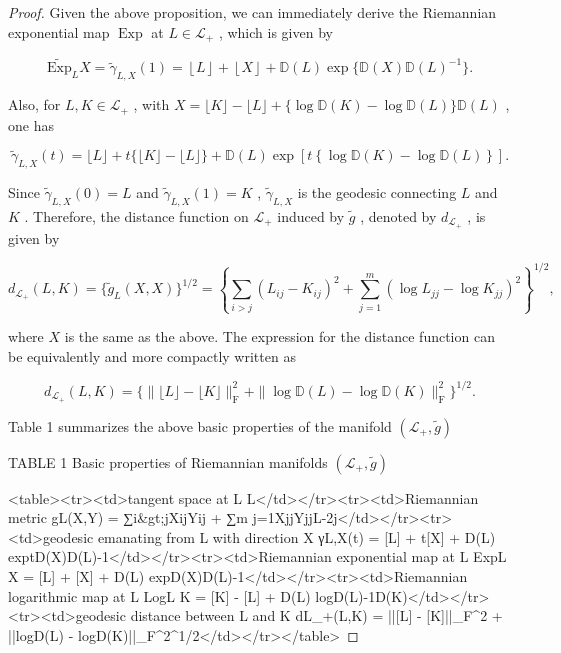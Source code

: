 \documentclass[11pt]{article}
\begin{document}
\begin{proof}
Given the above proposition, we can immediately derive the Riemannian exponential map  $\operatorname{Exp}$  at  $L \in \mathcal{L}_{+}$ , which is given by

$$
\widetilde {\mathrm {E x p}} _ {L} X = \widetilde {\gamma} _ {L, X} (1) = \left\lfloor L \right\rfloor + \left\lfloor X \right\rfloor + \mathbb {D} (L) \exp \{\mathbb {D} (X) \mathbb {D} (L) ^ {- 1} \}.
$$

Also, for  $L, K \in \mathcal{L}_{+}$ , with  $X = \lfloor K \rfloor - \lfloor L \rfloor + \{\log \mathbb{D}(K) - \log \mathbb{D}(L)\} \mathbb{D}(L)$ , one has

$$
\tilde {\gamma} _ {L, X} (t) = \lfloor L \rfloor + t \{\lfloor K \rfloor - \lfloor L \rfloor \} + \mathbb {D} (L) \exp \left[ t \left\{\log \mathbb {D} (K) - \log \mathbb {D} (L) \right\} \right].
$$

Since  $\tilde{\gamma}_{L,X}(0) = L$  and  $\tilde{\gamma}_{L,X}(1) = K$ ,  $\tilde{\gamma}_{L,X}$  is the geodesic connecting  $L$  and  $K$ . Therefore, the distance function on  $\mathcal{L}_+$  induced by  $\tilde{g}$ , denoted by  $d_{\mathcal{L}_+}$ , is given by

$$
d _ {\mathcal {L} _ {+}} (L, K) = \{\tilde {g} _ {L} (X, X) \} ^ {1 / 2} = \left\{\sum_ {i > j} (L _ {i j} - K _ {i j}) ^ {2} + \sum_ {j = 1} ^ {m} (\log L _ {j j} - \log K _ {j j}) ^ {2} \right\} ^ {1 / 2},
$$

where  $X$  is the same as the above. The expression for the distance function can be equivalently and more compactly written as

$$
d _ {\mathcal {L} _ {+}} (L, K) = \{\| \lfloor L \rfloor - \lfloor K \rfloor \| _ {\mathrm {F}} ^ {2} + \| \log \mathbb {D} (L) - \log \mathbb {D} (K) \| _ {\mathrm {F}} ^ {2} \} ^ {1 / 2}.
$$

Table 1 summarizes the above basic properties of the manifold  $(\mathcal{L}_{+},\tilde{g})$


TABLE 1 Basic properties of Riemannian manifolds  $(\mathcal{L}_{+},\tilde{g})$


<table><tr><td>tangent space at L
L</td></tr><tr><td>Riemannian metric
gL(X,Y) = ∑i&gt;jXijYij + ∑m
j=1XjjYjjL-2j</td></tr><tr><td>geodesic emanating from L with direction X
γL,X(t) = [L] + t[X] + D(L) exp{tD(X)D(L)-1}</td></tr><tr><td>Riemannian exponential map at L
ExpL X = [L] + [X] + D(L) exp{D(X)D(L)-1}</td></tr><tr><td>Riemannian logarithmic map at L
LogL K = [K] - [L] + D(L) log{D(L)-1D(K)}</td></tr><tr><td>geodesic distance between L and K
dL_+(L,K) = {||[L] - [K]||_F^2 + ||logD(L) - logD(K)||_F^2}^{1/2}</td></tr></table>


\end{proof}
\end{document}
